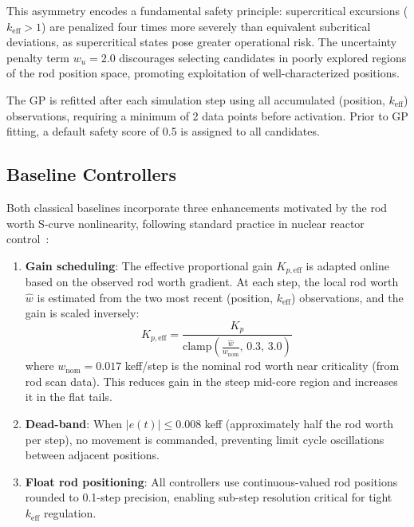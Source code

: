 \documentclass[11pt,twocolumn]{article}
\begin{document}
This asymmetry encodes a fundamental safety principle: supercritical excursions ($k_\text{eff} > 1$) are penalized four times more severely than equivalent subcritical deviations, as supercritical states pose greater operational risk.
The uncertainty penalty term $w_u = 2.0$ discourages selecting candidates in poorly explored regions of the rod position space, promoting exploitation of well-characterized positions.

The GP is refitted after each simulation step using all accumulated (position, $k_\text{eff}$) observations, requiring a minimum of 2 data points before activation.
Prior to GP fitting, a default safety score of 0.5 is assigned to all candidates.

\subsection{Baseline Controllers}

Both classical baselines incorporate three enhancements motivated by the rod worth S-curve nonlinearity, following standard practice in nuclear reactor control~\cite{cho2012nuclear}:

\begin{enumerate}
    \item \textbf{Gain scheduling}: The effective proportional gain $K_{p,\text{eff}}$ is adapted online based on the observed rod worth gradient. At each step, the local rod worth $\hat{w}$ is estimated from the two most recent (position, $k_\text{eff}$) observations, and the gain is scaled inversely:
    \begin{equation}
        K_{p,\text{eff}} = \frac{K_p}{\text{clamp}\!\left(\frac{\hat{w}}{w_\text{nom}},\, 0.3,\, 3.0\right)}
    \end{equation}
    where $w_\text{nom} = 0.017$ keff/step is the nominal rod worth near criticality (from rod scan data). This reduces gain in the steep mid-core region and increases it in the flat tails.

    \item \textbf{Dead-band}: When $|e(t)| \leq 0.008$ keff (approximately half the rod worth per step), no movement is commanded, preventing limit cycle oscillations between adjacent positions.

    \item \textbf{Float rod positioning}: All controllers use continuous-valued rod positions rounded to 0.1-step precision, enabling sub-step resolution critical for tight $k_\text{eff}$ regulation.
\end{enumerate}
\end{document}
